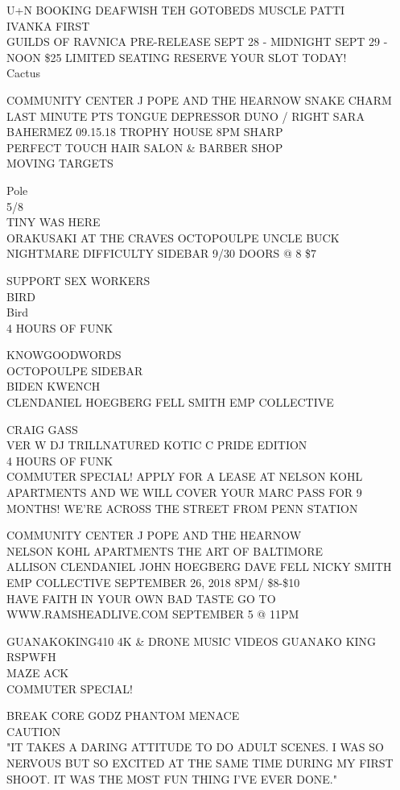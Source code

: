 \documentclass[10pt,letterpaper]{article}
\begin{document}
U+N BOOKING DEAFWISH TEH GOTOBEDS MUSCLE PATTI\\
IVANKA FIRST\\
GUILDS OF RAVNICA PRE{-}RELEASE SEPT 28 {-} MIDNIGHT SEPT 29 {-} NOON \$25 LIMITED SEATING RESERVE YOUR SLOT TODAY!\\
Cactus

COMMUNITY CENTER J POPE AND THE HEARNOW SNAKE CHARM\\
LAST MINUTE PTS TONGUE DEPRESSOR DUNO / RIGHT SARA BAHERMEZ 09.15.18 TROPHY HOUSE 8PM SHARP\\
PERFECT TOUCH HAIR SALON \& BARBER SHOP\\
MOVING TARGETS

Pole\\
5/8\\
TINY WAS HERE\\
ORAKUSAKI AT THE CRAVES OCTOPOULPE UNCLE BUCK NIGHTMARE DIFFICULTY SIDEBAR 9/30 DOORS @ 8 \$7

SUPPORT SEX WORKERS\\
BIRD\\
Bird\\
4 HOURS OF FUNK

KNOWGOODWORDS\\
OCTOPOULPE SIDEBAR\\
BIDEN KWENCH\\
CLENDANIEL HOEGBERG FELL SMITH EMP COLLECTIVE

CRAIG GASS\\
VER W DJ TRILLNATURED KOTIC C PRIDE EDITION\\
4 HOURS OF FUNK\\
COMMUTER SPECIAL!  APPLY FOR A LEASE AT NELSON KOHL APARTMENTS AND WE WILL COVER YOUR MARC PASS FOR 9 MONTHS!  WE'RE ACROSS THE STREET FROM PENN STATION

COMMUNITY CENTER J POPE AND THE HEARNOW\\
NELSON KOHL APARTMENTS THE ART OF BALTIMORE\\
ALLISON CLENDANIEL JOHN HOEGBERG DAVE FELL NICKY SMITH EMP COLLECTIVE SEPTEMBER 26, 2018 8PM/ \$8{-}\$10\\
HAVE FAITH IN YOUR OWN BAD TASTE GO TO WWW.RAMSHEADLIVE.COM SEPTEMBER 5 @ 11PM

GUANAKOKING410 4K \& DRONE MUSIC VIDEOS GUANAKO KING\\
RSPWFH\\
MAZE ACK\\
COMMUTER SPECIAL!

BREAK CORE GODZ PHANTOM MENACE\\
CAUTION\\
"IT TAKES A DARING ATTITUDE TO DO ADULT SCENES.  I WAS SO NERVOUS BUT SO EXCITED AT THE SAME TIME DURING MY FIRST SHOOT.  IT WAS THE MOST FUN THING I'VE EVER DONE."
\end{document}
